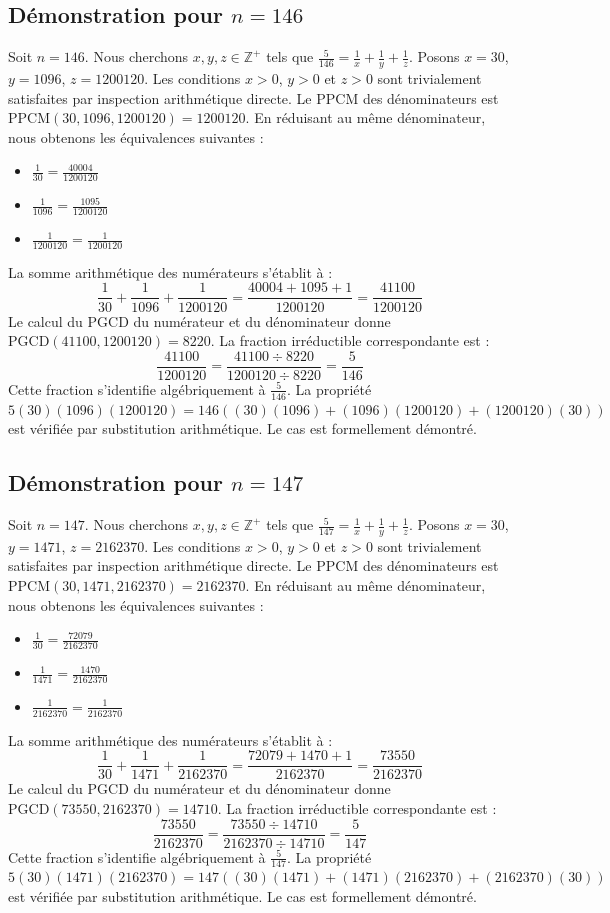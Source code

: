 \documentclass[12pt,a4paper]{article}
\begin{document}
\subsection{Démonstration pour $n = 146$}
Soit $n = 146$. Nous cherchons $x, y, z \in \mathbb{Z}^{+}$ tels que $\frac{5}{146} = \frac{1}{x} + \frac{1}{y} + \frac{1}{z}$.
Posons $x = 30$, $y = 1096$, $z = 1200120$.
Les conditions $x > 0$, $y > 0$ et $z > 0$ sont trivialement satisfaites par inspection arithmétique directe.
Le PPCM des dénominateurs est $\text{PPCM}(30, 1096, 1200120) = 1200120$.
En réduisant au même dénominateur, nous obtenons les équivalences suivantes :
\begin{itemize}
    \item $\frac{1}{30} = \frac{40004}{1200120}$
    \item $\frac{1}{1096} = \frac{1095}{1200120}$
    \item $\frac{1}{1200120} = \frac{1}{1200120}$
\end{itemize}
La somme arithmétique des numérateurs s'établit à :
$$ \frac{1}{30} + \frac{1}{1096} + \frac{1}{1200120} = \frac{40004 + 1095 + 1}{1200120} = \frac{41100}{1200120} $$
Le calcul du PGCD du numérateur et du dénominateur donne $\text{PGCD}(41100, 1200120) = 8220$.
La fraction irréductible correspondante est :
$$ \frac{41100}{1200120} = \frac{41100 \div 8220}{1200120 \div 8220} = \frac{5}{146} $$
Cette fraction s'identifie algébriquement à $\frac{5}{146}$.
La propriété $5(30)(1096)(1200120) = 146((30)(1096) + (1096)(1200120) + (1200120)(30))$ est vérifiée par substitution arithmétique.
Le cas est formellement démontré.

\subsection{Démonstration pour $n = 147$}
Soit $n = 147$. Nous cherchons $x, y, z \in \mathbb{Z}^{+}$ tels que $\frac{5}{147} = \frac{1}{x} + \frac{1}{y} + \frac{1}{z}$.
Posons $x = 30$, $y = 1471$, $z = 2162370$.
Les conditions $x > 0$, $y > 0$ et $z > 0$ sont trivialement satisfaites par inspection arithmétique directe.
Le PPCM des dénominateurs est $\text{PPCM}(30, 1471, 2162370) = 2162370$.
En réduisant au même dénominateur, nous obtenons les équivalences suivantes :
\begin{itemize}
    \item $\frac{1}{30} = \frac{72079}{2162370}$
    \item $\frac{1}{1471} = \frac{1470}{2162370}$
    \item $\frac{1}{2162370} = \frac{1}{2162370}$
\end{itemize}
La somme arithmétique des numérateurs s'établit à :
$$ \frac{1}{30} + \frac{1}{1471} + \frac{1}{2162370} = \frac{72079 + 1470 + 1}{2162370} = \frac{73550}{2162370} $$
Le calcul du PGCD du numérateur et du dénominateur donne $\text{PGCD}(73550, 2162370) = 14710$.
La fraction irréductible correspondante est :
$$ \frac{73550}{2162370} = \frac{73550 \div 14710}{2162370 \div 14710} = \frac{5}{147} $$
Cette fraction s'identifie algébriquement à $\frac{5}{147}$.
La propriété $5(30)(1471)(2162370) = 147((30)(1471) + (1471)(2162370) + (2162370)(30))$ est vérifiée par substitution arithmétique.
Le cas est formellement démontré.
\end{document}
